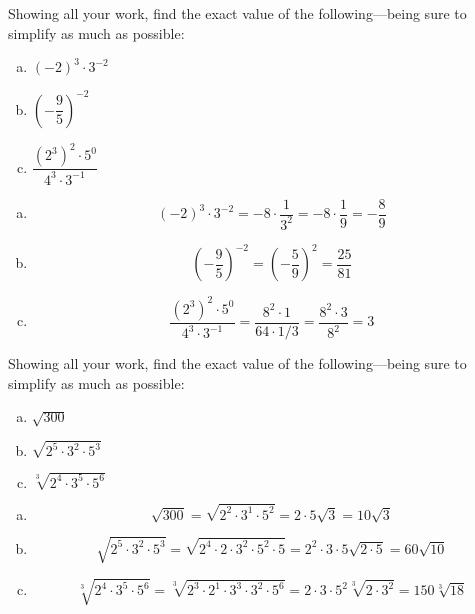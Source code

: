 \documentclass[11pt,letterpaper]{article}
\begin{document}

 Showing all your work, find the exact value of the following---being sure to simplify as much as possible:
	\begin{enumerate}[(a)]
	\item $(-2)^3 \cdot 3^{-2}$
	\item $\left( -\dfrac{9}{5} \right)^{-2}$
	\item $\dfrac{(2^3)^2 \cdot 5^0}{4^3 \cdot 3^{-1}}$
	\end{enumerate} \pspace

\sol
\begin{enumerate}[(a)]
\item 
	\[
	(-2)^3 \cdot 3^{-2}= -8 \cdot \dfrac{1}{3^2}= -8 \cdot \dfrac{1}{9}= -\dfrac{8}{9}
	\] \pspace

\item 
	\[
	\left( -\dfrac{9}{5} \right)^{-2}= \left( -\dfrac{5}{9} \right)^2= \dfrac{25}{81}
	\] \pspace

\item 
	\[
	\dfrac{(2^3)^2 \cdot 5^0}{4^3 \cdot 3^{-1}}= \dfrac{8^2 \cdot 1}{64 \cdot 1/3}= \dfrac{8^2 \cdot 3}{8^2}= 3
	\]
\end{enumerate}



\newpage



 Showing all your work, find the exact value of the following---being sure to simplify as much as possible:
	\begin{enumerate}[(a)]
	\item $\sqrt{300}$
	\item $\sqrt{2^5 \cdot 3^2 \cdot 5^3}$
	\item $\sqrt[3]{2^{4} \cdot 3^5 \cdot 5^6}$
	\end{enumerate} \pspace

\sol
\begin{enumerate}[(a)]
\item 
	\[
	\sqrt{300}= \sqrt{2^2 \cdot 3^1 \cdot 5^2}= 2 \cdot 5 \sqrt{3}= 10 \sqrt{3}
	\] \pspace

\item 
	\[
	\sqrt{2^5 \cdot 3^2 \cdot 5^3}= \sqrt{2^4 \cdot 2 \cdot 3^2 \cdot 5^2 \cdot 5}= 2^2 \cdot 3 \cdot 5 \sqrt{2 \cdot 5}= 60 \sqrt{10}
	\] \pspace

\item 
	\[
	\sqrt[3]{2^{4} \cdot 3^5 \cdot 5^6}= \sqrt[3]{2^3 \cdot 2^1 \cdot 3^3 \cdot 3^2 \cdot 5^6}= 2 \cdot 3 \cdot 5^2 \sqrt[3]{2 \cdot 3^2}= 150 \sqrt[3]{18}
	\]
\end{enumerate}
\end{document}
